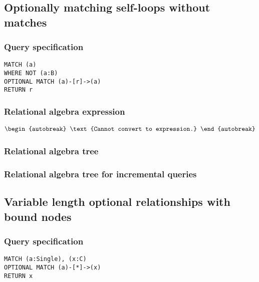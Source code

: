 \subsection{Optionally matching self-loops without matches}

\subsubsection*{Query specification}

\begin{lstlisting}
MATCH (a)
WHERE NOT (a:B)
OPTIONAL MATCH (a)-[r]->(a)
RETURN r
\end{lstlisting}

\subsubsection*{Relational algebra expression}

\begin{align*}
\begin{autobreak}
\text{Cannot convert to expression.}
\end{autobreak}
\end{align*}

\subsubsection*{Relational algebra tree}


\subsubsection*{Relational algebra tree for incremental queries}


\subsection{Variable length optional relationships with bound nodes}

\subsubsection*{Query specification}

\begin{lstlisting}
MATCH (a:Single), (x:C)
OPTIONAL MATCH (a)-[*]->(x)
RETURN x
\end{lstlisting}

